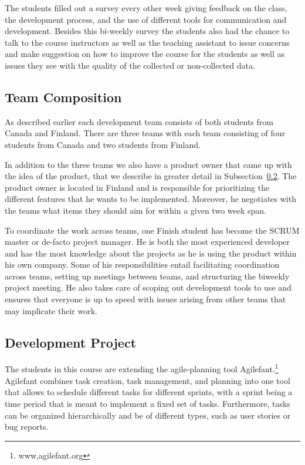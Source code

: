 The students filled out a survey every other week giving feedback on the class, the development process, and the use of different tools for communication and development.
Besides this bi-weekly survey the students also had the chance to talk to the course instructors as well as the teaching assistant to issue concerns and make suggestion on how to improve the course for the students as well as issues they see with the quality of the collected or non-collected data.

\subsection{Team Composition}
As described earlier each development team consists of both students from Canada and Finland.
There are three teams with each team consisting of four students from Canada and two students from Finland.

In addition to the three teams we also have a product owner that came up with the idea of the product, that we describe in greater detail in Subsection~\ref{chap:make:subset:devproject}.
The product owner is located in Finland and is responsible for prioritizing the different features that he wants to be implemented.
Moreover, he negotiates with the teams what items they should aim for within a given two week span. 

To coordinate the work across teams, one Finish student has become the SCRUM master or de-facto project manager.
He is both the most experienced developer and has the most knowledge about the projects as he is using the product within his own company.
Some of his responsibilities entail facilitating coordination across teams,  setting up meetings between teams, and structuring the biweekly project meeting.
He also takes care of scoping out development tools to use and ensures that everyone is up to speed with issues arising from other teams that may implicate their work.

\subsection{Development Project}
\label{chap:make:subset:devproject}
The students in this course are extending the agile-planning tool Agilefant.\footnote{www,agilefant.org}
Agilefant combines task creation, task management, and planning into one tool that allows to schedule different tasks for different sprints, with a sprint being a time period that is meant to implement a fixed set of tasks.
Furthermore, tasks can be organized hierarchically and be of different types, such as user stories or bug reports.
 
